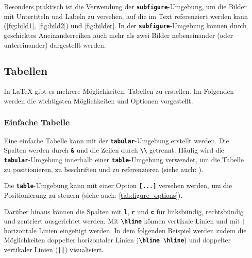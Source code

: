 Besonders praktisch ist die Verwendung der \textbf{\texttt{subfigure}}-Umgebung, um die Bilder mit Untertiteln und Labeln zu versehen, auf die im Text referenziert werden kann (\autoref{fig:bild1}, \autoref{fig:bild2}) und \autoref{fig:bilder}.
In der \textbf{\texttt{subfigure}}-Umgebung können durch geschicktes Aneinanderreihen auch mehr als zwei Bilder nebeneinander (oder untereinander) dargestellt werden.


\subsection{Tabellen}
In \LaTeX{} gibt es mehrere Möglichkeiten, Tabellen zu erstellen. Im Folgenden werden die wichtigsten Möglichkeiten und Optionen vorgestellt.

\subsubsection{Einfache Tabelle}
Eine einfache Tabelle kann mit der \textbf{\texttt{tabular}}-Umgebung erstellt werden. Die Spalten werden durch \textbf{\texttt{\&}} und die Zeilen durch \textbf{\texttt{\textbackslash\textbackslash}} getrennt. Häufig wird die \textbf{\texttt{tabular}}-Umgebung innerhalb einer \textbf{\texttt{table}}-Umgebung verwendet, um die Tabelle zu positionieren, zu beschriften und zu referenzieren (siehe auch: ).

Die \textbf{\texttt{table}}-Umgebung kann mit einer Option \textbf{\texttt{[...]}} versehen werden, um die Positionierung zu steuern (siehe auch: \autoref{tab:figure_options}).

Darüber hinaus können die Spalten mit \textbf{\texttt{l}}, \textbf{\texttt{r}} und \textbf{\texttt{c}} für linksbündig, rechtsbündig und zentriert ausgerichtet werden. Mit \textbf{\texttt{\textbackslash hline}} können vertikale Linien und mit \textbf{\texttt{|}} horizontale Linien eingefügt werden. In dem folgenden Beispiel werden zudem die Möglichkeiten doppelter horizontaler Linien (\textbf{\texttt{\textbackslash hline \textbackslash hline}}) und doppelter vertikaler Linien (\textbf{\texttt{||}}) visualisiert.

